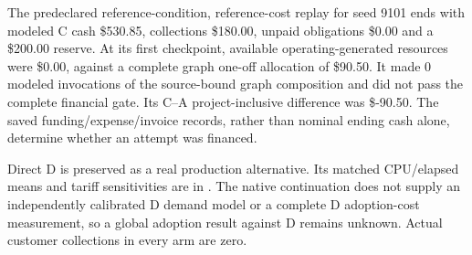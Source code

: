 
The predeclared reference-condition, reference-cost replay for seed 9101 ends with modeled C cash \$530.85, collections \$180.00, unpaid obligations \$0.00 and a \$200.00 reserve. At its first checkpoint, available operating-generated resources were \$0.00, against a complete graph one-off allocation of \$90.50. It made 0 modeled invocations of the source-bound graph composition and did not pass the complete financial gate. Its C--A project-inclusive difference was \$-90.50. The saved funding/expense/invoice records, rather than nominal ending cash alone, determine whether an attempt was financed.

Direct D is preserved as a real production alternative. Its matched CPU/elapsed means and tariff sensitivities are in . The native continuation does not supply an independently calibrated D demand model or a complete D adoption-cost measurement, so a global adoption result against D remains unknown. Actual customer collections in every arm are zero.
